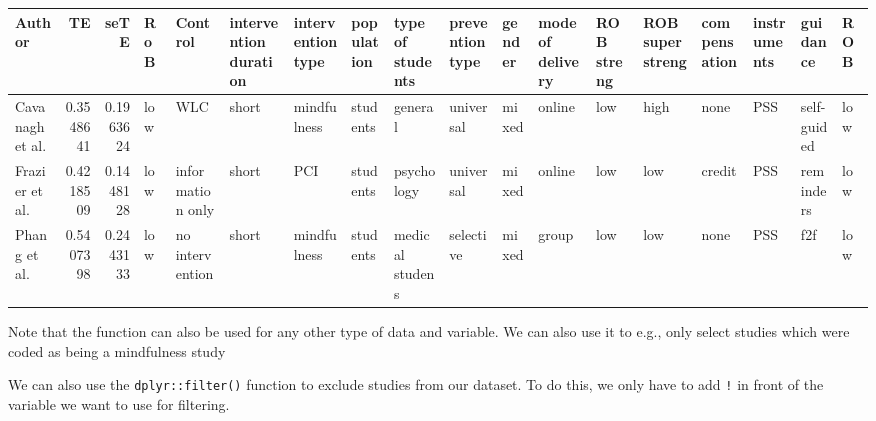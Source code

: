 \documentclass[]{book}
\newenvironment{Shaded}{\begin{snugshade}}{\end{snugshade}}
\newcommand{\KeywordTok}[1]{\textcolor[rgb]{0.13,0.29,0.53}{\textbf{#1}}}
\newcommand{\DataTypeTok}[1]{\textcolor[rgb]{0.13,0.29,0.53}{#1}}
\newcommand{\StringTok}[1]{\textcolor[rgb]{0.31,0.60,0.02}{#1}}
\newcommand{\OperatorTok}[1]{\textcolor[rgb]{0.81,0.36,0.00}{\textbf{#1}}}
\newcommand{\NormalTok}[1]{#1}
\theoremstyle{definition}
\theoremstyle{definition}
\theoremstyle{definition}
\theoremstyle{remark}
\begin{document}
\begin{tabular}{l|r|r|l|l|l|l|l|l|l|l|l|l|l|l|l|l|l}
\hline
Author & TE & seTE & RoB & Control & intervention duration & intervention type & population & type of students & prevention type & gender & mode of delivery & ROB streng & ROB superstreng & compensation & instruments & guidance & ROB\\
\hline
Cavanagh et al. & 0.3548641 & 0.1963624 & low & WLC & short & mindfulness & students & general & universal & mixed & online & low & high & none & PSS & self-guided & low\\
\hline
Frazier et al. & 0.4218509 & 0.1448128 & low & information only & short & PCI & students & psychology & universal & mixed & online & low & low & credit & PSS & reminders & low\\
\hline
Phang et al. & 0.5407398 & 0.2443133 & low & no intervention & short & mindfulness & students & medical studens & selective & mixed & group & low & low & none & PSS & f2f & low\\
\hline
\end{tabular}

Note that the function can also be used for any other type of data and
variable. We can also use it to e.g., only select studies which were
coded as being a mindfulness study

\begin{Shaded}
\end{Shaded}

We can also use the \texttt{dplyr::filter()} function to exclude studies
from our dataset. To do this, we only have to add \texttt{!} in front of
the variable we want to use for filtering.

\begin{Shaded}
\end{Shaded}
\end{document}
